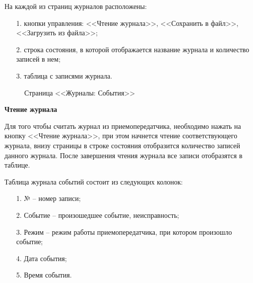 На каждой из страниц журналов расположены:
\begin{enumerate}
	\item[1.] кнопки управления: <<Чтение журнала>>, <<Сохранить в файл>>, <<Загрузить из файла>>;
	\item[2.] строка состояния, в которой отображается название журнала и количество записей в нем;
	\item[3.] таблица с записями журнала.
\end{enumerate}

\begin{figure}[H]
	
	\caption{Страница <<Журналы: События>>}
	\label{fig:configurator_journal_evt}
\end{figure}

\textbf{Чтение журнала}

Для того чтобы считать журнал из приемопередатчика, необходимо нажать на кнопку <<Чтение журнала>>, при этом начнется чтение соответствующего журнала, внизу страницы в строке состояния отобразится количество записей данного журнала. После завершения чтения журнала все записи отобразятся в таблице.

Таблица журнала событий состоит из следующих колонок:
\begin{enumerate}
	\item[1.] № – номер записи;
	\item[2.] Событие – произошедшее событие, неисправность;
	\item[3.] Режим – режим работы приемопередатчика, при котором произошло событие;
	\item[4.] Дата события;
	\item[5.] Время события.
\end{enumerate}

